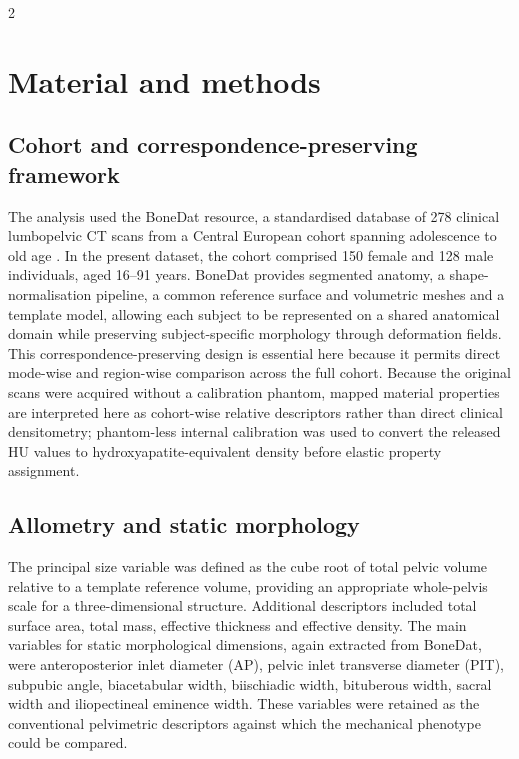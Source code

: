 \documentclass[openacc]{rsproca_new}
\begin{document}
\begin{multicols}{2}
\section{Material and methods}

\subsection{Cohort and correspondence-preserving framework}

The analysis used the BoneDat resource, a standardised database of 278 clinical lumbopelvic CT scans from a Central European cohort spanning adolescence to old age \cite{HenysKuchar2025}. In the present dataset, the cohort comprised 150 female and 128 male individuals, aged 16--91 years. BoneDat provides segmented anatomy, a shape-normalisation pipeline, a common reference surface and volumetric meshes and a template model, allowing each subject to be represented on a shared anatomical domain while preserving subject-specific morphology through deformation fields. This correspondence-preserving design is essential here because it permits direct mode-wise and region-wise comparison across the full cohort. Because the original scans were acquired without a calibration phantom, mapped material properties are interpreted here as cohort-wise relative descriptors rather than direct clinical densitometry; phantom-less internal calibration was used to convert the released HU values to hydroxyapatite-equivalent density before elastic property assignment.

\subsection{Allometry and static morphology}

The principal size variable was defined as the cube root of total pelvic volume relative to a template reference volume, providing an appropriate whole-pelvis scale for a three-dimensional structure. Additional descriptors included total surface area, total mass, effective thickness and effective density. The main variables for static morphological dimensions, again extracted from BoneDat, were anteroposterior inlet diameter (AP), pelvic inlet transverse diameter (PIT), subpubic angle, biacetabular width, biischiadic width, bituberous width, sacral width and iliopectineal eminence width. These variables were retained as the conventional pelvimetric descriptors against which the mechanical phenotype could be compared.


\end{multicols}
\end{document}
